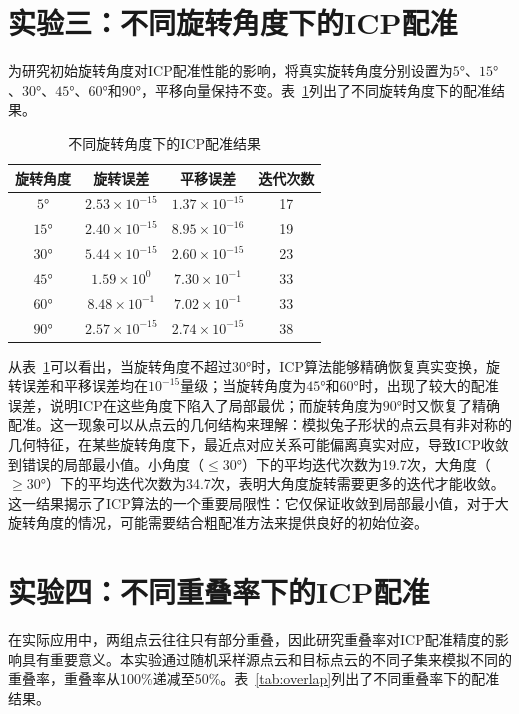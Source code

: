 \documentclass[a4paper,12pt]{ctexrep}
\begin{document}
\section{实验三：不同旋转角度下的ICP配准}

为研究初始旋转角度对ICP配准性能的影响，将真实旋转角度分别设置为$5°$、$15°$、$30°$、$45°$、$60°$和$90°$，平移向量保持不变。表~\ref{tab:angle}列出了不同旋转角度下的配准结果。

\begin{table}[H]
    \centering
    \caption{不同旋转角度下的ICP配准结果}
    \label{tab:angle}
    \begin{tabular}{cccc}
        \toprule
        旋转角度 & 旋转误差 & 平移误差 & 迭代次数 \\
        \midrule
        $5°$  & $2.53\times 10^{-15}$ & $1.37\times 10^{-15}$ & 17 \\
        $15°$ & $2.40\times 10^{-15}$ & $8.95\times 10^{-16}$ & 19 \\
        $30°$ & $5.44\times 10^{-15}$ & $2.60\times 10^{-15}$ & 23 \\
        $45°$ & $1.59\times 10^{0}$   & $7.30\times 10^{-1}$  & 33 \\
        $60°$ & $8.48\times 10^{-1}$  & $7.02\times 10^{-1}$  & 33 \\
        $90°$ & $2.57\times 10^{-15}$ & $2.74\times 10^{-15}$ & 38 \\
        \bottomrule
    \end{tabular}
\end{table}

从表~\ref{tab:angle}可以看出，当旋转角度不超过$30°$时，ICP算法能够精确恢复真实变换，旋转误差和平移误差均在$10^{-15}$量级；当旋转角度为$45°$和$60°$时，出现了较大的配准误差，说明ICP在这些角度下陷入了局部最优；而旋转角度为$90°$时又恢复了精确配准。这一现象可以从点云的几何结构来理解：模拟兔子形状的点云具有非对称的几何特征，在某些旋转角度下，最近点对应关系可能偏离真实对应，导致ICP收敛到错误的局部最小值。小角度（$\leq 30°$）下的平均迭代次数为19.7次，大角度（$\geq 30°$）下的平均迭代次数为34.7次，表明大角度旋转需要更多的迭代才能收敛。这一结果揭示了ICP算法的一个重要局限性：它仅保证收敛到局部最小值，对于大旋转角度的情况，可能需要结合粗配准方法来提供良好的初始位姿。

\section{实验四：不同重叠率下的ICP配准}

在实际应用中，两组点云往往只有部分重叠，因此研究重叠率对ICP配准精度的影响具有重要意义。本实验通过随机采样源点云和目标点云的不同子集来模拟不同的重叠率，重叠率从100\%递减至50\%。表~\ref{tab:overlap}列出了不同重叠率下的配准结果。
\end{document}
